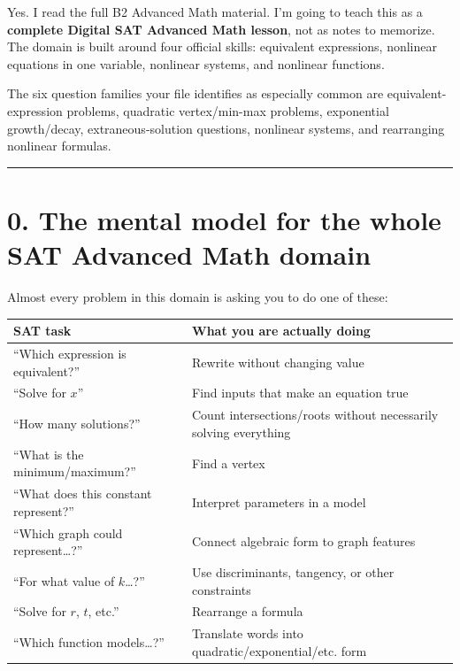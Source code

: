 \documentclass[
]{article}
\author{}
\date{}
\newcounter{none} %
\begin{document}
{
\setcounter{tocdepth}{3}
\tableofcontents
}
Yes. I read the full B2 Advanced Math material. I'm going to teach this
as a \textbf{complete Digital SAT Advanced Math lesson}, not as notes to
memorize. The domain is built around four official skills: equivalent
expressions, nonlinear equations in one variable, nonlinear systems, and
nonlinear functions.

The six question families your file identifies as especially common are
equivalent-expression problems, quadratic vertex/min-max problems,
exponential growth/decay, extraneous-solution questions, nonlinear
systems, and rearranging nonlinear formulas.

\begin{center}\rule{0.5\linewidth}{0.5pt}\end{center}

\section{0. The mental model for the whole SAT Advanced Math
domain}\label{the-mental-model-for-the-whole-sat-advanced-math-domain}

Almost every problem in this domain is asking you to do one of these:

{\def\LTcaptype{none} %
\begin{longtable}[]{@{}
  >{\raggedright\arraybackslash}p{}
  >{\raggedright\arraybackslash}p{}@{}}
\toprule\noalign{}
\begin{minipage}[b]{\linewidth}\raggedright
SAT task
\end{minipage} & \begin{minipage}[b]{\linewidth}\raggedright
What you are actually doing
\end{minipage} \\
\midrule\noalign{}
\endhead
\bottomrule\noalign{}
\endlastfoot
``Which expression is equivalent?'' & Rewrite without changing value \\
``Solve for \(x\)'' & Find inputs that make an equation true \\
``How many solutions?'' & Count intersections/roots without necessarily
solving everything \\
``What is the minimum/maximum?'' & Find a vertex \\
``What does this constant represent?'' & Interpret parameters in a
model \\
``Which graph could represent\ldots?'' & Connect algebraic form to graph
features \\
``For what value of \(k\)\ldots?'' & Use discriminants, tangency, or
other constraints \\
``Solve for \(r\), \(t\), etc.'' & Rearrange a formula \\
``Which function models\ldots?'' & Translate words into
quadratic/exponential/etc. form \\
\end{longtable}
}
\end{document}
